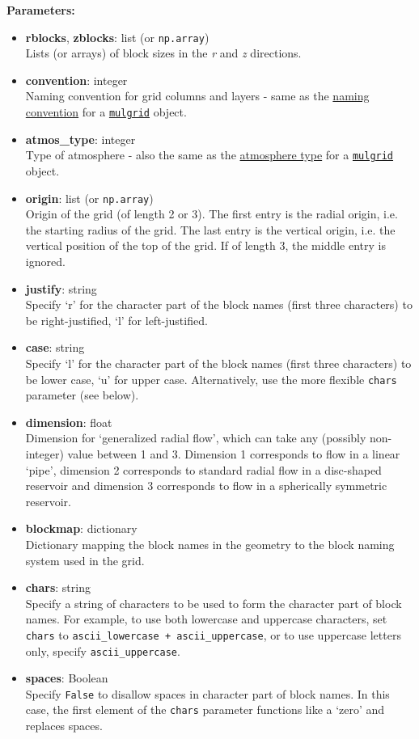 \textbf{Parameters:}
\begin{itemize}
\item \textbf{rblocks}, \textbf{zblocks}: list (or \texttt{np.array})\\
  Lists (or arrays) of block sizes in the \emph{r} and \emph{z} directions.
\item \textbf{convention}: integer\\
  Naming convention for grid columns and layers - same as the \hyperref[geometry_format_conventions]{naming convention} for a \hyperref[mulgrids]{\texttt{mulgrid}} object.
\item \textbf{atmos\_type}: integer\\
  Type of atmosphere - also the same as the \hyperref[geometry_format_conventions]{atmosphere type} for a \hyperref[mulgrids]{\texttt{mulgrid}} object.
\item \textbf{origin}: list (or \texttt{np.array})\\
  Origin of the grid (of length 2 or 3).  The first entry is the radial origin, i.e. the starting radius of the grid.  The last entry is the vertical origin, i.e. the vertical position of the top of the grid.  If of length 3, the middle entry is ignored.
\item \textbf{justify}: string\\
  Specify `r' for the character part of the block names (first three characters) to be right-justified, `l' for left-justified.
\item \textbf{case}: string\\
  Specify `l' for the character part of the block names (first three characters) to be lower case, `u' for upper case. Alternatively, use the more flexible \texttt{chars} parameter (see below).
\item \textbf{dimension}: float\\
  Dimension for `generalized radial flow', which can take any (possibly non-integer) value between 1 and 3.  Dimension 1 corresponds to flow in a linear `pipe', dimension 2 corresponds to standard radial flow in a disc-shaped reservoir and dimension 3 corresponds to flow in a spherically symmetric reservoir.
\item \textbf{blockmap}: dictionary\\
  Dictionary mapping the block names in the geometry to the block naming system used in the grid.
\item \textbf{chars}: string\\
  Specify a string of characters to be used to form the character part of block names.  For example, to use both lowercase and uppercase characters, set \texttt{chars} to \texttt{ascii\_lowercase + ascii\_uppercase}, or to use uppercase letters only, specify \texttt{ascii\_uppercase}.
\item \textbf{spaces}: Boolean\\
  Specify \texttt{False} to disallow spaces in character part of block names. In this case, the first element of the \texttt{chars} parameter functions like a `zero' and replaces spaces.
\end{itemize}

